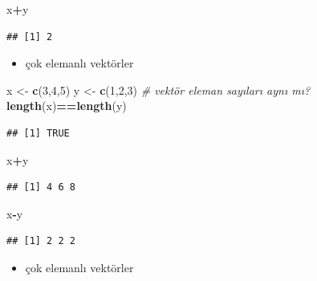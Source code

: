 \documentclass[
  oneside]{book}
\newenvironment{Shaded}{\begin{snugshade}}{\end{snugshade}}
\newcommand{\CommentTok}[1]{\textcolor[rgb]{0.56,0.35,0.01}{\textit{#1}}}
\newcommand{\DecValTok}[1]{\textcolor[rgb]{0.00,0.00,0.81}{#1}}
\newcommand{\FunctionTok}[1]{\textcolor[rgb]{0.13,0.29,0.53}{\textbf{#1}}}
\newcommand{\NormalTok}[1]{#1}
\newcommand{\OtherTok}[1]{\textcolor[rgb]{0.56,0.35,0.01}{#1}}
\newcommand{\SpecialCharTok}[1]{\textcolor[rgb]{0.81,0.36,0.00}{\textbf{#1}}}
\providecommand{\tightlist}{%
  \setlength{\itemsep}{0pt}\setlength{\parskip}{0pt}}
\begin{document}
\begin{Shaded}
\begin{Highlighting}[]
\NormalTok{x}\SpecialCharTok{+}\NormalTok{y}
\end{Highlighting}
\end{Shaded}

\begin{verbatim}
## [1] 2
\end{verbatim}

\begin{itemize}
\tightlist
\item
  çok elemanlı vektörler
\end{itemize}

\begin{Shaded}
\begin{Highlighting}[]
\NormalTok{x }\OtherTok{\textless{}{-}} \FunctionTok{c}\NormalTok{(}\DecValTok{3}\NormalTok{,}\DecValTok{4}\NormalTok{,}\DecValTok{5}\NormalTok{)}
\NormalTok{y }\OtherTok{\textless{}{-}} \FunctionTok{c}\NormalTok{(}\DecValTok{1}\NormalTok{,}\DecValTok{2}\NormalTok{,}\DecValTok{3}\NormalTok{)}
\CommentTok{\# vektör eleman sayıları aynı mı?}
\FunctionTok{length}\NormalTok{(x)}\SpecialCharTok{==}\FunctionTok{length}\NormalTok{(y)}
\end{Highlighting}
\end{Shaded}

\begin{verbatim}
## [1] TRUE
\end{verbatim}

\begin{Shaded}
\begin{Highlighting}[]
\NormalTok{x}\SpecialCharTok{+}\NormalTok{y}
\end{Highlighting}
\end{Shaded}

\begin{verbatim}
## [1] 4 6 8
\end{verbatim}

\begin{Shaded}
\begin{Highlighting}[]
\NormalTok{x}\SpecialCharTok{{-}}\NormalTok{y}
\end{Highlighting}
\end{Shaded}

\begin{verbatim}
## [1] 2 2 2
\end{verbatim}

\begin{itemize}
\tightlist
\item
  çok elemanlı vektörler
\end{itemize}
\end{document}
